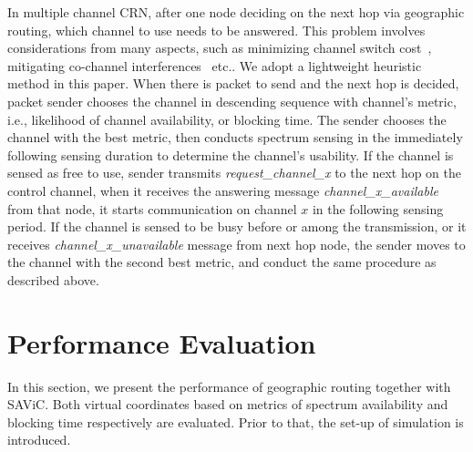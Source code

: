 In multiple channel CRN, after one node deciding on the next hop via geographic routing, which channel to use needs to be answered.
This problem involves considerations from many aspects, such as minimizing channel switch cost~\cite{spectrumDecision_2013mass}, mitigating co-channel interferences~\cite{DySpAN12_Di} etc..
We adopt a lightweight heuristic method in this paper. 
When there is packet to send and the next hop is decided, packet sender chooses the channel in descending sequence with channel's metric, i.e., likelihood of channel availability, or blocking time.
The sender chooses the channel with the best metric, then conducts spectrum sensing in the immediately following sensing duration to determine the channel's usability.
If the channel is sensed as free to use, sender transmits \textit{request\_channel\_x} to the next hop on the control channel, when it receives the answering message \textit{channel\_x\_available} from that node, it starts communication on channel $x$ in the following sensing period.
If the channel is sensed to be busy before or among the transmission, or it receives \textit{channel\_x\_unavailable} message from next hop node, the sender moves to the channel with the second best metric, and conduct the same procedure as described above.




\section{Performance Evaluation}
In this section, we present the performance of geographic routing together with SAViC.
Both virtual coordinates based on metrics of spectrum availability and blocking time respectively are evaluated.
Prior to that, the set-up of simulation is introduced.


